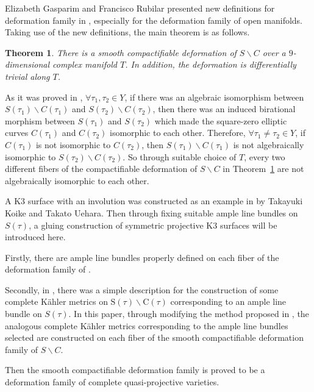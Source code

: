 \documentclass[pdftex]{sigma}
\numberwithin{equation}{section}
\newtheorem{Theorem}{Theorem}[section]
\begin{document}
Elizabeth Gasparim and Francisco Rubilar presented new definitions for deformation family in \cite{Elizabeth-Francisco}, especially for the deformation family of open manifolds. Taking use of the new definitions, the main theorem is as follows.

\begin{Theorem} \label{Theorem1.1}
There is a smooth compactifiable deformation of $S\backslash C$ over a $9$-dimensional complex manifold $T$. In addition, the deformation is differentially trivial along $T$.
\end{Theorem}

As it was proved in \cite{Anna}, $\forall \tau_1, \tau_2 \in\! Y$, if there was an algebraic isomorphism between $S(\tau_1)\backslash C(\tau_1)$ and $S(\tau_2)\backslash C(\tau_2)$, then there was an induced birational morphism between $S(\tau_1)$ and $S(\tau_2)$ which made the square-zero elliptic curves $C(\tau_1)$ and $C(\tau_2)$ isomorphic to each other. Therefore, ${\forall \tau_1 \neq \tau_2 \in Y}$, if $C(\tau_1)$ is not isomorphic to $C(\tau_2)$, then $S(\tau_1)\backslash C(\tau_1)$ is not algebraically isomorphic to $S(\tau_2)\backslash C(\tau_2)$. So through suitable choice of $T$, every two different fibers of the compactifiable deformation of $S\backslash C$ in Theorem~\ref{Theorem1.1} are not algebraically isomorphic to each other.

A K3 surface with an involution was constructed as an example in \cite[Section 7.1.2]{Takayuki-Takato1} by Takayuki Koike and Takato Uehara. Then through fixing suitable ample line bundles on $S(\tau)$, a gluing construction of symmetric projective K3 surfaces will be introduced here.

Firstly, there are ample line bundles properly defined on each fiber of the deformation family of  \cite{Tomasz-Halszka}.

Secondly, in \cite{Takayuki-Takato2}, there was a simple description for the construction of some complete K\"ahler metrics on $\text{S}(\tau)\backslash \text{C}(\tau)$ corresponding to an ample line bundle on $S(\tau)$. In this paper, through modifying the method proposed in \cite{Takayuki-Takato2}, the analogous complete K\"ahler metrics corresponding to the ample line bundles selected are constructed on each fiber of the smooth compactifiable deformation family of $S \backslash C$.

Then the smooth compactifiable deformation family is proved to be a deformation family of complete quasi-projective varieties.
\end{document}
